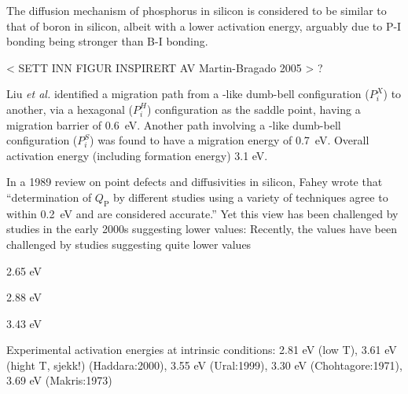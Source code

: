 \documentclass[11pt,bibliography=totoc,index=totoc]{scrbook}   %
\begin{document}
The diffusion mechanism of phosphorus in silicon is considered to be similar to that of boron in silicon, 
albeit with a lower activation energy, arguably due to P-I bonding being stronger than B-I bonding.\cite{Christensen:2003}

< SETT INN FIGUR INSPIRERT AV Martin-Bragado 2005 > ?





Liu \textit{et al.} identified a migration path from a -like dumb-bell configuration ($P_i^X$) to another, via a hexagonal ($P_i^H$) configuration as the saddle point, having a migration barrier of 0.6~eV.\cite{Liu:2003}
Another path involving a -like dumb-bell configuration ($P_i^S$) was found to have a migration energy of 0.7~eV. Overall activation energy (including formation energy) 3.1 eV.

In a 1989 review on point defects and diffusivities in silicon, Fahey wrote that ``determination of $Q_{\text{P}}$ by different studies using a variety of techniques agree to within 0.2~eV and are considered accurate.''\cite{Fahey:1989}
Yet this view has been challenged by studies in the early 2000s suggesting lower values: 
Recently, the values have been challenged by studies suggesting quite lower values

2.65 eV \cite{Wittel:1995}

2.88 eV \cite{Naganawa:2008}

3.43 eV \cite{Harrison:2006}

Experimental activation energies at intrinsic conditions: 2.81 eV (low T), 3.61 eV (hight T, sjekk!) (Haddara:2000), 3.55 eV (Ural:1999), 3.30 eV (Chohtagore:1971), 3.69 eV (Makris:1973)
\end{document}
